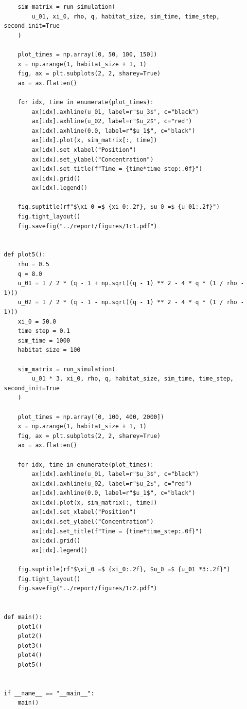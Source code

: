\documentclass[15pt]{article}
\begin{document}
\begin{verbatim}
    sim_matrix = run_simulation(
        u_01, xi_0, rho, q, habitat_size, sim_time, time_step, second_init=True
    )

    plot_times = np.array([0, 50, 100, 150])
    x = np.arange(1, habitat_size + 1, 1)
    fig, ax = plt.subplots(2, 2, sharey=True)
    ax = ax.flatten()

    for idx, time in enumerate(plot_times):
        ax[idx].axhline(u_01, label=r"$u_3$", c="black")
        ax[idx].axhline(u_02, label=r"$u_2$", c="red")
        ax[idx].axhline(0.0, label=r"$u_1$", c="black")
        ax[idx].plot(x, sim_matrix[:, time])
        ax[idx].set_xlabel("Position")
        ax[idx].set_ylabel("Concentration")
        ax[idx].set_title(f"Time = {time*time_step:.0f}")
        ax[idx].grid()
        ax[idx].legend()

    fig.suptitle(rf"$\xi_0 =$ {xi_0:.2f}, $u_0 =$ {u_01:.2f}")
    fig.tight_layout()
    fig.savefig("../report/figures/1c1.pdf")


def plot5():
    rho = 0.5
    q = 8.0
    u_01 = 1 / 2 * (q - 1 + np.sqrt((q - 1) ** 2 - 4 * q * (1 / rho - 1)))
    u_02 = 1 / 2 * (q - 1 - np.sqrt((q - 1) ** 2 - 4 * q * (1 / rho - 1)))
    xi_0 = 50.0
    time_step = 0.1
    sim_time = 1000
    habitat_size = 100

    sim_matrix = run_simulation(
        u_01 * 3, xi_0, rho, q, habitat_size, sim_time, time_step, second_init=True
    )

    plot_times = np.array([0, 100, 400, 2000])
    x = np.arange(1, habitat_size + 1, 1)
    fig, ax = plt.subplots(2, 2, sharey=True)
    ax = ax.flatten()

    for idx, time in enumerate(plot_times):
        ax[idx].axhline(u_01, label=r"$u_3$", c="black")
        ax[idx].axhline(u_02, label=r"$u_2$", c="red")
        ax[idx].axhline(0.0, label=r"$u_1$", c="black")
        ax[idx].plot(x, sim_matrix[:, time])
        ax[idx].set_xlabel("Position")
        ax[idx].set_ylabel("Concentration")
        ax[idx].set_title(f"Time = {time*time_step:.0f}")
        ax[idx].grid()
        ax[idx].legend()

    fig.suptitle(rf"$\xi_0 =$ {xi_0:.2f}, $u_0 =$ {u_01 *3:.2f}")
    fig.tight_layout()
    fig.savefig("../report/figures/1c2.pdf")


def main():
    plot1()
    plot2()
    plot3()
    plot4()
    plot5()


if __name__ == "__main__":
    main()
\end{verbatim}
\end{document}
